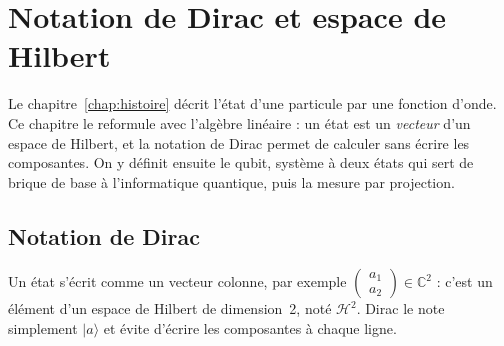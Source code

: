 
\providecommand{\ket}[1]{|#1\rangle}
\providecommand{\bra}[1]{\langle #1|}
\providecommand{\braket}[2]{\langle #1|#2\rangle}

\section{Notation de Dirac et espace de Hilbert}\label{chap:dirac}

Le chapitre~\ref{chap:histoire} décrit l'état d'une particule par une fonction d'onde. Ce
chapitre le reformule avec l'algèbre linéaire : un état est un \emph{vecteur} d'un espace de
Hilbert, et la notation de Dirac \parencite{dirac1939} permet de calculer sans écrire les
composantes. On y définit ensuite le \gls{qubit}, système à deux états qui sert de brique de
base à l'informatique quantique, puis la mesure par projection.

\subsection{Notation de Dirac}\label{sec:dirac}

Un état s'écrit comme un vecteur colonne, par exemple
$\begin{pmatrix} a_1\\ a_2\end{pmatrix}\in\mathbb{C}^2$ : c'est un élément d'un
espace de Hilbert de dimension~2, noté $\mathcal{H}^2$. Dirac le note simplement
$\ket{a}$ et évite d'écrire les composantes à chaque ligne.

